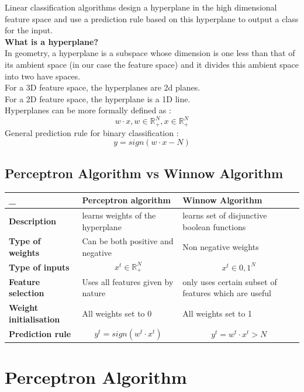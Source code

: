 \documentclass[11pt]{article}
\begin{document}
Linear classification algorithms design a hyperplane in the high dimensional feature space and use a prediction rule based on this hyperplane to output a class for  the input. \\
\textbf{What is a hyperplane?} \\
In geometry, a hyperplane is a subspace whose dimension is one less than that of its ambient space (in our case the feature space) and it divides this ambient space into two have spaces. \\
For a 3D feature space, the hyperplanes are 2d planes. \\
For a 2D feature space, the hyperplane is a 1D line.\\
Hyperplanes can be more formally defined as :
$$w\cdot x, w \in \mathbb{R}_+^N, x \in \mathbb{R}_+^N$$
General prediction rule for binary classification :
$$ y = sign(w\cdot x - N) $$


\subsection{Perceptron Algorithm vs Winnow Algorithm}

\begin{center}
\begin{tabular}{ | m{3cm} | m{6cm}| m{6cm} | } 
  \hline
  _ & \textbf{Perceptron algorithm} & \textbf{Winnow Algorithm} \\ 
  \hline
  \textbf{Description} & learns weights of the hyperplane & learns set of disjunctive boolean functions \\ 
  \hline
  \textbf{Type of weights} & Can be both positive and negative & Non negative weights \\ 
  \hline
  \textbf{Type of inputs} & $$ x^t \in \mathbb{R}_+^N $$  & $$ x^t \in {0,1}^N $$ \\ 
  \hline
  \textbf{Feature selection} & Uses all features given by nature  & only uses certain subset of features which are useful \\ 
  \hline
  \textbf{Weight initialisation} & All weights set to 0  & All weights set to 1 \\ 
  \hline
  \textbf{Prediction rule} & $$ y^t =sign(w^t\cdot x^t) $$  & $$ y^t =w^t\cdot x^t > N $$ \\
  \hline
\end{tabular}
\end{center}



\section{Perceptron Algorithm}
\end{document}
